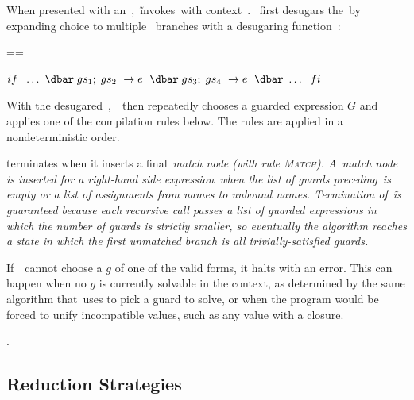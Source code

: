 \documentclass[article,screen,12pt, nonacm]{acmart}
\begin{document}
    When presented with an~\iffibf,~\DTran\~invokes~\Compile with context~\ctx.
    \Compile~first desugars the~\iffibf by expanding choice to multiple~\iffibf
    branches with a desugaring function~\ITran: 
    
    
    ==
    
    ${if\;~\dots~\dbar\; gs_{1};\; gs_{2}~\rightarrow e~\;\dbar\; gs_{3};\; gs_{4}~\rightarrow e~\;\dbar~\dots~\;fi}$

    With the desugared~\iffibf,~\Compile\ then repeatedly chooses a guarded
    expression $G$ and applies one of the compilation rules below. The rules are
    applied in a nondeterministic order. 

    \Compile terminates when it inserts a final~\it{match} node (with rule
    \textsc{Match}).  A~\it{match} node is inserted for a right-hand side expression~\expr when the list of
    guards preceding~\expr is empty or a list of assignments from names to
    unbound names. Termination of~\DTran\~is guaranteed because each recursive
    call passes a list of guarded expressions in which the number of guards is
    strictly smaller, so eventually the algorithm reaches a state in which the
    first unmatched branch is all trivially-satisfied guards.


    If~\Compile\ cannot choose a $g$ of one of the valid forms, it halts with an
    error. This can happen when no $g$ is currently solvable in the context, as
    determined by the same algorithm that~\VMinus uses to pick a guard to solve,
    or when the program would be forced to unify incompatible values, such as
    any value with a closure. 

    .

    

      \subsection{Reduction Strategies}
\end{document}
